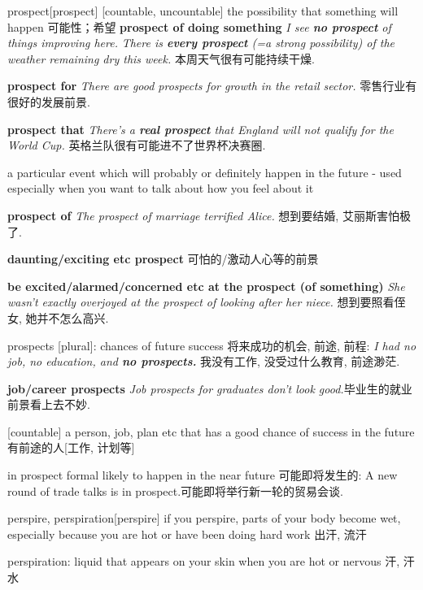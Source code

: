 \begin{DefWord}{prospect}[prospect]
    [countable, uncountable] the possibility that something will happen 可能性；希望
    \textbf{prospect of doing something}
    \textit{I see \textbf{no prospect} of things improving here.}
    \textit{There is \textbf{every prospect} (=a strong possibility) of the weather remaining dry this week.} 本周天气很有可能持续干燥. 
    
    \textbf{prospect for}
    \textit{There are good prospects for growth in the retail sector.} 零售行业有很好的发展前景. 

    \textbf{prospect that}
    \textit{There's a \textbf{real prospect} that England will not qualify for the World Cup.} 英格兰队很有可能进不了世界杯决赛圈. 

    a particular event which will probably or definitely happen in the future - used especially when you want to talk about how you feel about it

    \textbf{prospect of}
    \textit{The prospect of marriage terrified Alice.} 想到要结婚, 艾丽斯害怕极了. 
    
\textbf{daunting/exciting etc prospect} 可怕的/激动人心等的前景

\textbf{be excited/alarmed/concerned etc at the prospect (of something)}
 \textit{She wasn't exactly overjoyed at the prospect of looking after her niece.} 想到要照看侄女, 她并不怎么高兴. 

prospects [plural]: chances of future success 将来成功的机会, 前途, 前程:
 \textit{I had no job, no education, and \textbf{no prospects.}} 我没有工作, 没受过什么教育, 前途渺茫. 

\textbf{job/career prospects}
 \textit{Job prospects for graduates don't look good.}毕业生的就业前景看上去不妙. 

[countable] a person, job, plan etc that has a good chance of success in the future 有前途的人[工作, 计划等]

in prospect formal likely to happen in the near future 可能即将发生的:
 A new round of trade talks is in prospect.可能即将举行新一轮的贸易会谈. 
\end{DefWord}

\begin{DefWord}{perspire, perspiration}[perspire]
    if you perspire, parts of your body become wet, especially because you are hot or have been doing hard work 出汗, 流汗

    perspiration: liquid that appears on your skin when you are hot or nervous 汗, 汗水
\end{DefWord}

